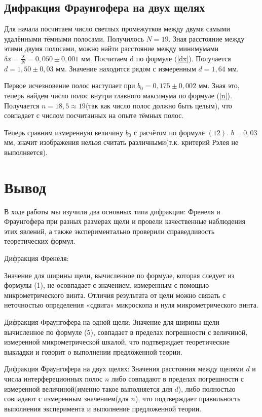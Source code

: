 \documentclass[a4paper,12pt]{article}
\begin{document}
\subsection{Дифракция Фраунгофера на двух щелях}
Для начала посчитаем число светлых промежутков между двумя самыми удалёнными тёмными полосами. Получилось $N = 19$. Зная расстояние между этими двумя полосами, можно найти расстояние между минимумами $\delta x = \frac{X}{N} = 0,050 \pm 0,001$ мм. Посчитаем d по формуле (\ref{dx}). Получается $d = 1,50 \pm 0,03$ мм. Значение находится рядом с измеренным $d = 1,64$ мм.

Первое исчезновение полос наступает при $b_0 = 0,175 \pm 0,002$ мм. Зная это, теперь найдем число полос внутри главного максимума по формуле (\ref{n}). Получается $n = 18,5 \approx 19$(так как число полос должно быть целым), что совпадает с числом посчитанных на опыте тёмных полос. 

Теперь сравним измеренную величину $b_0$ с расчётом по формуле $(12)$. $b = 0,03$ мм, значит изображения нельзя считать различными(т.к. критерий Рэлея не выполняется).


\section{Вывод}
В ходе работы мы изучили два основных типа дифракции: Френеля и 
Фраунгофера при разных размерах щели и провели качественные 
наблюдения этих явлений, а также экспериментально проверили 
справедливость теоретических формул.

Дифракция Френеля: 

Значение для ширины щели, вычисленное по формуле, которая следует из формулы (1), не осовпадает с значением, измеренным с помощью микрометрического винта. Отличия 
результата от цели можно связать с неточностью определения 
«сдвига» микроскопа и нуля микрометрического винта. 

Дифракция Фраунгофера на одной щели: 
Значение для ширины щели вычисленное по формуле (5), совпадает в пределах погрешности с величиной, измеренной микрометрической шкалой, что подтверждает теоретические выкладки и говорит о выполнении предложенной теории.

Дифракция Фраунгофера на двух щелях:
Значения расстояния между щелями $d$ и числа интерфереционных полос $n$ либо совпадают в пределах погрешности с измеренной величиной(именно такое выполняется для $d$), либо полностью совпадают с измеренным значением(для $n$), что подтверждает правильность выполнения эксперимента и выполнение предложенной теории.
\end{document}

